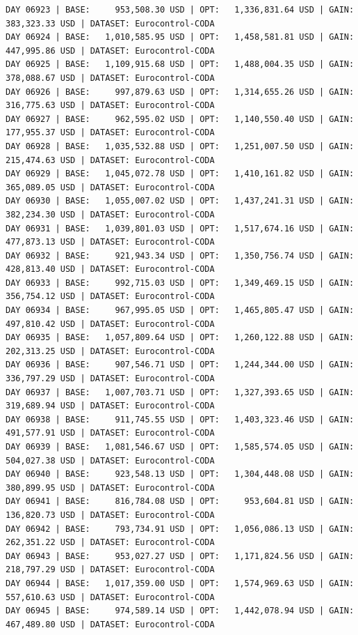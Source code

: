 \documentclass[11pt,a4paper]{article}
\begin{document}
\begin{verbatim}
DAY 06923 | BASE:     953,508.30 USD | OPT:   1,336,831.64 USD | GAIN: 383,323.33 USD | DATASET: Eurocontrol-CODA
DAY 06924 | BASE:   1,010,585.95 USD | OPT:   1,458,581.81 USD | GAIN: 447,995.86 USD | DATASET: Eurocontrol-CODA
DAY 06925 | BASE:   1,109,915.68 USD | OPT:   1,488,004.35 USD | GAIN: 378,088.67 USD | DATASET: Eurocontrol-CODA
DAY 06926 | BASE:     997,879.63 USD | OPT:   1,314,655.26 USD | GAIN: 316,775.63 USD | DATASET: Eurocontrol-CODA
DAY 06927 | BASE:     962,595.02 USD | OPT:   1,140,550.40 USD | GAIN: 177,955.37 USD | DATASET: Eurocontrol-CODA
DAY 06928 | BASE:   1,035,532.88 USD | OPT:   1,251,007.50 USD | GAIN: 215,474.63 USD | DATASET: Eurocontrol-CODA
DAY 06929 | BASE:   1,045,072.78 USD | OPT:   1,410,161.82 USD | GAIN: 365,089.05 USD | DATASET: Eurocontrol-CODA
DAY 06930 | BASE:   1,055,007.02 USD | OPT:   1,437,241.31 USD | GAIN: 382,234.30 USD | DATASET: Eurocontrol-CODA
DAY 06931 | BASE:   1,039,801.03 USD | OPT:   1,517,674.16 USD | GAIN: 477,873.13 USD | DATASET: Eurocontrol-CODA
DAY 06932 | BASE:     921,943.34 USD | OPT:   1,350,756.74 USD | GAIN: 428,813.40 USD | DATASET: Eurocontrol-CODA
DAY 06933 | BASE:     992,715.03 USD | OPT:   1,349,469.15 USD | GAIN: 356,754.12 USD | DATASET: Eurocontrol-CODA
DAY 06934 | BASE:     967,995.05 USD | OPT:   1,465,805.47 USD | GAIN: 497,810.42 USD | DATASET: Eurocontrol-CODA
DAY 06935 | BASE:   1,057,809.64 USD | OPT:   1,260,122.88 USD | GAIN: 202,313.25 USD | DATASET: Eurocontrol-CODA
DAY 06936 | BASE:     907,546.71 USD | OPT:   1,244,344.00 USD | GAIN: 336,797.29 USD | DATASET: Eurocontrol-CODA
DAY 06937 | BASE:   1,007,703.71 USD | OPT:   1,327,393.65 USD | GAIN: 319,689.94 USD | DATASET: Eurocontrol-CODA
DAY 06938 | BASE:     911,745.55 USD | OPT:   1,403,323.46 USD | GAIN: 491,577.91 USD | DATASET: Eurocontrol-CODA
DAY 06939 | BASE:   1,081,546.67 USD | OPT:   1,585,574.05 USD | GAIN: 504,027.38 USD | DATASET: Eurocontrol-CODA
DAY 06940 | BASE:     923,548.13 USD | OPT:   1,304,448.08 USD | GAIN: 380,899.95 USD | DATASET: Eurocontrol-CODA
DAY 06941 | BASE:     816,784.08 USD | OPT:     953,604.81 USD | GAIN: 136,820.73 USD | DATASET: Eurocontrol-CODA
DAY 06942 | BASE:     793,734.91 USD | OPT:   1,056,086.13 USD | GAIN: 262,351.22 USD | DATASET: Eurocontrol-CODA
DAY 06943 | BASE:     953,027.27 USD | OPT:   1,171,824.56 USD | GAIN: 218,797.29 USD | DATASET: Eurocontrol-CODA
DAY 06944 | BASE:   1,017,359.00 USD | OPT:   1,574,969.63 USD | GAIN: 557,610.63 USD | DATASET: Eurocontrol-CODA
DAY 06945 | BASE:     974,589.14 USD | OPT:   1,442,078.94 USD | GAIN: 467,489.80 USD | DATASET: Eurocontrol-CODA

\end{verbatim}
\end{document}
